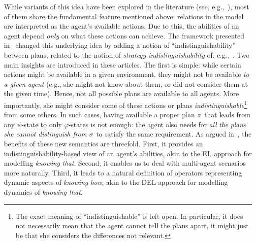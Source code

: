 While variants of this idea have been explored in the literature (see, e.g.,~\cite{Li17,LiWang17,FervariHLW17,Wang19a}),
most of them share the fundamental feature mentioned above: relations in the model are interpreted as the agent's available actions. Due to this, the abilities of an agent depend \emph{only} on what these actions can achieve. The framework presented in~\cite{AFSVQ21,AFSVQ23report} changed this underlying idea by adding a notion of ``indistinguishability'' between plans, related to the notion of \emph{strategy indistinguishability} of, e.g.,~\cite{JamrogaH04,Belardinelli14}. Two main insights are introduced in these articles. The first is simple: while certain actions might be available in a given environment, they might not be available \emph{to a given agent} (e.g., she might not know about them, or did not consider them at the given time). Hence, not all possible plans are available to all agents.  More importantly, she might consider some of these actions or plans \emph{indistinguishable}\footnote{The exact meaning of ``indistinguishable'' is left open. In particular, it does not necessarily mean that the agent cannot tell the plans apart, it might just be that she considers the differences not relevant.} from some others. In such cases, having available a proper plan $\sigma$ that leads from any $\psi$-state to only $\varphi$-states is not enough: the agent also needs for \emph{all the plans she cannot distinguish from $\sigma$} to satisfy the same requirement. As argued in~\cite{AFSVQ21}, the benefits of these new semantics are threefold. First, it provides an indistinguishability-based view of an agent's abilities, akin to the EL approach for modelling \emph{knowing that}. Second, it enables us to deal with multi-agent scenarios more naturally. Third, it leads to a natural definition of operators representing dynamic aspects of \emph{knowing how}, akin to the DEL approach for modelling dynamics of \emph{knowing that}.
%
